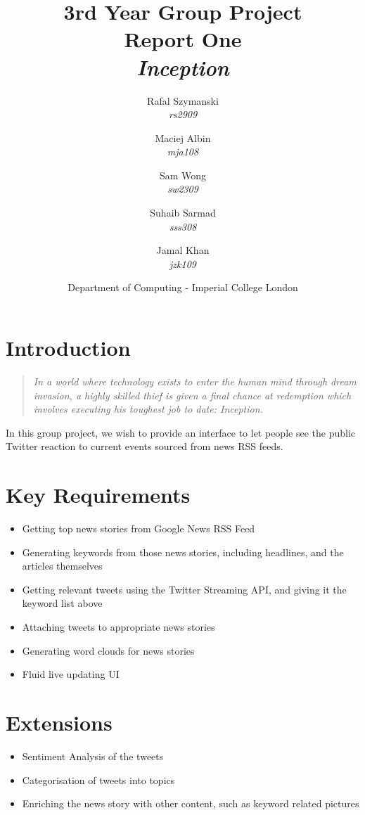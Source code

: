 \documentclass[a4paper,11pt]{article}
\title{3rd Year Group Project\\Report One\\\emph{Inception}}
\author{
    \small{Rafal Szymanski}\\
		\small{\emph{rs2909}}
  	\and
    \small{Maciej Albin}\\
		\small{\emph{mja108}}
    \and
    \small{Sam Wong}\\
		\small{\emph{sw2309}}
    \and
    \small{Suhaib Sarmad}\\
		\small{\emph{sss308}}
		\and
		\small{Jamal Khan}\\
		\small{\emph{jzk109}}
		\and
		Department of Computing - Imperial College London
}
\begin{document}
 
	\maketitle
	
	\section{Introduction}
	
	\begin{quote}
\emph{In a world where technology exists to enter the human mind through dream invasion, a highly skilled thief is given a final chance at redemption which involves executing his toughest job to date: Inception.}	\end{quote}

	In this group project, we wish to provide an interface to let people see the public Twitter reaction to current events sourced from news RSS feeds.

	
	\section{Key Requirements}
		
		\begin{itemize}
			\item Getting top news stories from Google News RSS Feed
			\item Generating keywords from those news stories, including headlines, and the articles themselves
			\item Getting relevant tweets using the Twitter Streaming API, and giving it the keyword list above
			\item Attaching tweets to appropriate news stories
			\item Generating word clouds for news stories
			\item Fluid live updating UI
		\end{itemize}
		
	\section{Extensions}
	
		\begin{itemize}
			\item Sentiment Analysis of the tweets
			\item Categorisation of tweets into topics
			\item Enriching the news story with other content, such as keyword related pictures
		\end{itemize}
	
\end{document}
